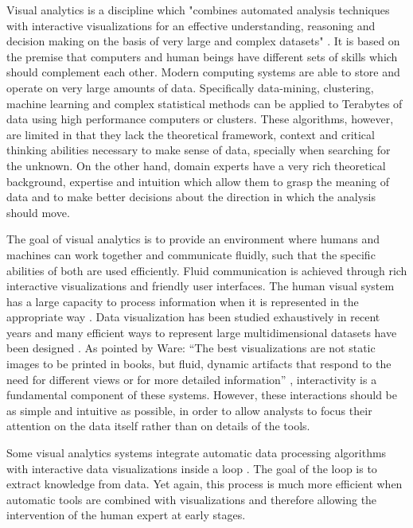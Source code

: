 Visual analytics is a discipline which "combines automated analysis techniques with interactive
visualizations for an effective understanding, reasoning and decision making on the basis of very
large and complex datasets" \autocite{cook_illuminating_2005}. It is based on the premise that computers and
human beings have different sets of skills which should complement each other. Modern
computing systems are able to store and operate on very large amounts of data.
Specifically data-mining, clustering, machine learning and complex statistical methods can be
applied to Terabytes of data using high performance computers or clusters. These
algorithms, however, are limited in that they lack the theoretical framework, context and critical
thinking abilities necessary to make sense of data, specially when searching for the unknown.
On the other hand, domain experts have a very rich theoretical
background, expertise and intuition which allow them to grasp the meaning of data and to
make better decisions about the direction in which the analysis should move.

The goal of visual analytics is to provide an environment where humans and machines can work
together and communicate fluidly, such that the specific abilities of both are used
efficiently. Fluid communication is achieved through rich interactive
visualizations and friendly user interfaces.
The human visual system has a large capacity to process information when it is
represented in the appropriate way \autocite{ware_information_2004}. Data visualization has been studied
exhaustively in recent years and many efficient ways to represent large multidimensional
datasets have been designed \autocite{heer_tour_2010}. As
pointed by Ware: "`The best visualizations are not static images to be printed in books, but fluid,
dynamic artifacts that respond to the need for different views or for more detailed
information"' \autocite{ware_information_2004}, interactivity is a fundamental component of these systems.
However,  these interactions should be
as simple and intuitive as possible, in order to allow analysts to focus their attention on the
data itself \autocite{spence_information_2007} rather than on details of the tools.

Some visual analytics systems integrate automatic data processing algorithms with interactive data visualizations
inside a loop \autocite{keim_mastering_2010}. The goal of the loop is to extract knowledge from data. Yet again, this process
is much more efficient when automatic tools are combined with visualizations and therefore allowing the intervention of the
human expert at early stages.

